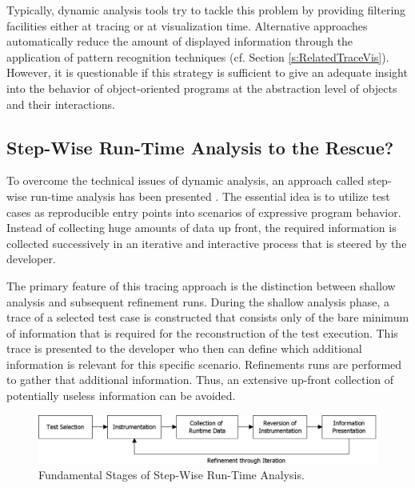 Typically, dynamic analysis tools try to tackle this problem by providing filtering facilities either at tracing or at visualization time.
Alternative approaches automatically reduce the amount of displayed information through the application of pattern recognition techniques (cf. Section \ref{s:RelatedTraceVis}).
However, it is questionable if this strategy is sufficient to give an adequate insight into the behavior of object-oriented programs at the abstraction level of objects and their interactions.

\subsection{Step-Wise Run-Time Analysis to the Rescue?}
\label{ss:BackgroundTracing}
To overcome the technical issues of dynamic analysis, an approach called step-wise run-time analysis has been presented \citep{perscheid_immediacy_2010, perscheid_test-driven_2013}.
The essential idea is to utilize test cases as reproducible entry points into scenarios of expressive program behavior.
Instead of collecting huge amounts of data up front, the required information is collected successively in an iterative and interactive process that is steered by the developer.

The primary feature of this tracing approach is the distinction between shallow analysis and subsequent refinement runs.
During the shallow analysis phase, a trace of a selected test case is constructed that consists only of the bare minimum of information that is required for the reconstruction of the test execution.
This trace is presented to the developer who then can define which additional information is relevant for this specific scenario.
Refinements runs are performed to gather that additional information.
Thus, an extensive up-front collection of potentially useless information can be avoided.

\begin{figure}[tb]
	\centering
	\includegraphics[width=1.0\textwidth]{../images/02-TracingProcess}
	\caption{Fundamental Stages of Step-Wise Run-Time Analysis.}
	\label{fig:BackgroundTracingApproach}
\end{figure}

